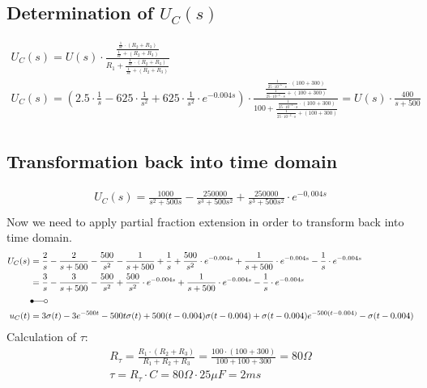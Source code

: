 \documentclass[a4paper]{article}
\begin{document}
\subsection{Determination of $U_C(s)$}
\begin{align*}
	U_C(s) = U(s) \cdot \frac{\frac{\frac{1}{sc}\cdot (R_2+R_3)}{\frac{1}{sc} + (R_2+R_3)}}{R_1 + \frac{\frac{1}{sc}\cdot (R_2+R_3)}{\frac{1}{sc} + (R_2+R_3)}}\\
	U_C(s) = \left(2.5 \cdot \frac{1}{s} - 625 \cdot \frac{1}{s^2} + 625 \cdot \frac{1}{s^2} \cdot e^{-0.004s} \right) \cdot \frac{\frac{\frac{1}{25\cdot10^{-6}\cdot s}\cdot (100+300)}{\frac{1}{25\cdot10^{-6}\cdot s} + (100+300)}}
	{100 + \frac{\frac{1}{25\cdot10^{-6}\cdot s}\cdot (100+300)}{\frac{1}{25\cdot10^{-6}\cdot s} + (100+300)}} =
	U(s) \cdot \frac{400}{s+500}\\
\end{align*}

\subsection{Transformation back into time domain}
\begin{align*}
	U_C(s) = \frac{1000}{s^2+500s} - \frac{250000}{s^3+500s^2} + \frac{250000}{s^3+500s^2} \cdot e^{-0,004s}\\
\end{align*}
Now we need to apply partial fraction extension in order to transform back into time domain.
\begin{align*}
	U_C(s) &= \frac{2}{s} - \frac{2}{s+500} - \frac{500}{s^2} - \frac{1}{s+500} + \frac{1}{s} + \frac{500}{s^2} \cdot e^{-0.004s} + \frac{1}{s+500} \cdot e^{-0.004s} - \frac{1}{s} \cdot e^{-0.004s}\\
	&= \frac{3}{s} - \frac{3}{s+500} - \frac{500}{s^2} + \frac{500}{s^2} \cdot e^{-0.004s} + \frac{1}{s+500} \cdot e^{-0.004s} - \frac{1}{s} \cdot e^{-0.004s}\\
	&\Laplace\\
	u_C(t) &= 3\sigma(t) -3e^{-500t} - 500t\sigma(t) + 500(t-0.004)\sigma(t-0.004) + \sigma(t-0.004)e^{-500(t-0.004)} - \sigma(t-0.004)
\end{align*}
Calculation of $\tau$:
\begin{align*}
	R_\tau = \frac{R_1 \cdot (R_2 + R_3)}{R_1 + R_2 + R_3} = \frac{100 \cdot (100 + 300)}{100 + 100 + 300} = 80\Omega\\
	\tau = R_\tau \cdot C = 80\Omega \cdot 25\mu F = 2ms\\
\end{align*}
\end{document}
